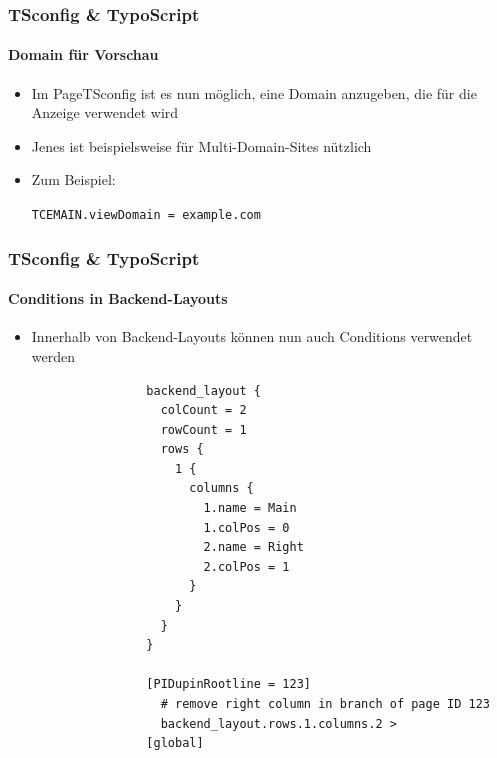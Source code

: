 
\begin{frame}[fragile]
	\frametitle{TSconfig \& TypoScript}
	\framesubtitle{Domain für Vorschau}

	\begin{itemize}

		\item Im PageTSconfig ist es nun möglich, eine Domain anzugeben, die für die Anzeige verwendet wird
		\item Jenes ist beispielsweise für Multi-Domain-Sites nützlich
		\item Zum Beispiel:

			\lstinline!TCEMAIN.viewDomain = example.com!

	\end{itemize}

\end{frame}


\begin{frame}[fragile]
	\frametitle{TSconfig \& TypoScript}
	\framesubtitle{Conditions in Backend-Layouts}

	\begin{itemize}

		\item Innerhalb von Backend-Layouts können nun auch Conditions verwendet werden

			\lstset{
				basicstyle=\tiny\ttfamily
			}

			\begin{lstlisting}
				backend_layout {
				  colCount = 2
				  rowCount = 1
				  rows {
				    1 {
				      columns {
				        1.name = Main
				        1.colPos = 0
				        2.name = Right
				        2.colPos = 1
				      }
				    }
				  }
				}

				[PIDupinRootline = 123]
				  # remove right column in branch of page ID 123
				  backend_layout.rows.1.columns.2 >
				[global]
			\end{lstlisting}

	\end{itemize}

\end{frame}

